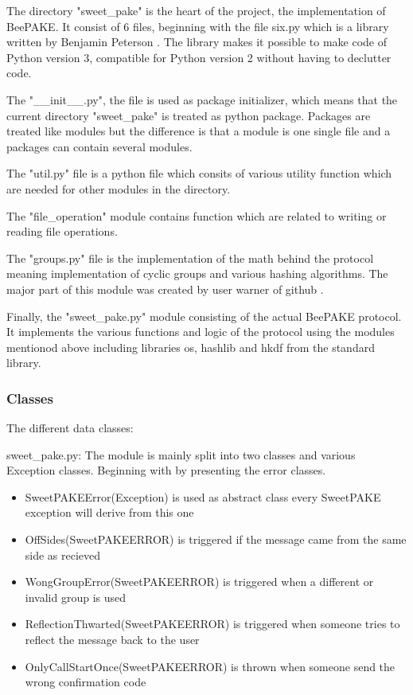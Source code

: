 \documentclass[../main.tex]{subfiles}
\begin{document}
The directory "sweet\_pake" is the heart of the project, the implementation of
BeePAKE. It consist of 6 files, beginning with the file six.py which is a
library written by Benjamin Peterson \cite{peterson2010}. The library makes it
possible to make code of Python version 3, compatible for Python version 2
without having to declutter code. 

The "\_\_init\_\_.py", the file is used as package initializer, which means
that the current directory "sweet\_pake" is treated as python package. Packages
are treated like modules but the difference is that a module is one single file
and a packages can contain several modules.

The "util.py" file is a python file which consits of various utility function
which are needed for other modules in the directory. 

The "file\_operation" module contains function which are related to writing or
reading file operations. 

The "groups.py" file is the implementation of the math behind the protocol
meaning implementation of cyclic groups and various hashing algorithms. The major
part of this module was created by user warner of github \cite{Warner2013}.

Finally, the "sweet\_pake.py" module consisting of the actual BeePAKE protocol.
It implements the various functions and logic of the protocol using the modules
mentionod above including libraries os, hashlib and hkdf from the standard library.

\subsubsection{Classes}
The different data classes:

sweet\_pake.py: The module is mainly split into two classes and various
Exception classes. Beginning with by presenting the error classes.
\begin{itemize} 
	\item SweetPAKEError(Exception) is used as abstract class every
			SweetPAKE exception will derive from this one 
	\item OffSides(SweetPAKEERROR) is triggered if the message came from
		the same side as recieved
	\item WongGroupError(SweetPAKEERROR) is triggered when a different or
		invalid group is used
	\item ReflectionThwarted(SweetPAKEERROR) is triggered when someone tries to reflect the message back to the user
	\item OnlyCallStartOnce(SweetPAKEERROR) is thrown when someone send the wrong confirmation code
\end{itemize}
\end{document}
